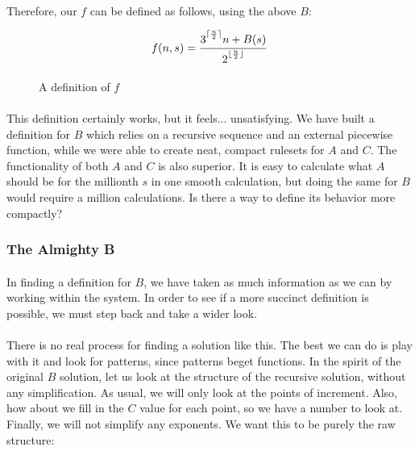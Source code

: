 \documentclass[12pt,letterpaper]{article}
\begin{document}
			\paragraph{} Therefore, our $f$ can be defined as follows, using the above $B$:
			
			\begin{figure}[h]
				\begin{equation*}
					f(n, s) = \frac{3\strut^{\lceil \frac{n}{2} \rceil} n + B(s)}{2\strut^{\lfloor \frac{n}{2} \rfloor}}
				\end{equation*}
				
				\caption{A definition of $f$}
			\end{figure}
		
			\paragraph{} This definition certainly works, but it feels... unsatisfying. We have built a definition for $B$ which relies on a recursive sequence and an external piecewise function, while we were able to create neat, compact rulesets for $A$ and $C$. The functionality of both $A$ and $C$ is also superior. It is easy to calculate what $A$ should be for the millionth $s$ in one smooth calculation, but doing the same for $B$ would require a million calculations. Is there a way to define its behavior more compactly?
			
			
		\subsubsection{The Almighty B}
			
			\paragraph{} In finding a definition for $B$, we have taken as much information as we can by working within the system. In order to see if a more succinct definition is possible, we must step back and take a wider look.
			
			\paragraph{} There is no real process for finding a solution like this. The best we can do is play with it and look for patterns, since patterns beget functions. In the spirit of the original $B$ solution, let us look at the structure of the recursive solution, without any simplification. As usual, we will only look at the points of increment. Also, how about we fill in the $C$ value for each point, so we have a number to look at. Finally, we will not simplify any exponents. We want this to be purely the raw structure:
			
\end{document}
